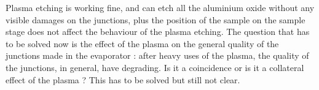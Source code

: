             Plasma etching is working fine, and can etch all the aluminium oxide without any visible damages on the junctions, plus the position of the sample on the sample stage does not affect the behaviour of the plasma etching. The question that has to be solved now is the effect of the plasma on the general quality of the junctions made in the evaporator : after heavy uses of the plasma, the quality of the junctions, in general, have degrading. Is it a coincidence or is it a collateral effect of the plasma ? This has to be solved but still not clear.
                
                
